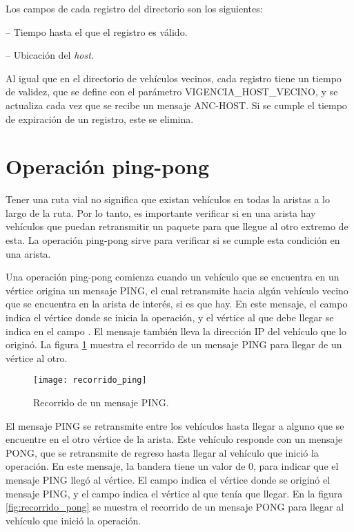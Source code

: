 Los campos de cada registro del directorio son los siguientes:

 -- Tiempo hasta el que el registro es válido.

 -- Ubicación del \textit{host}.

Al igual que en el directorio de vehículos vecinos, cada registro tiene un
tiempo de validez, que se define con el parámetro VIGENCIA\_HOST\_VECINO, y se
actualiza cada vez que se recibe un mensaje ANC-HOST. Si se cumple el tiempo de
expiración de un registro, este se elimina.

\section{Operación ping-pong}

\label{sec:operacion_ping_pong}

Tener una ruta vial no significa que existan vehículos en todas la aristas a
lo largo de la ruta. Por lo tanto, es importante verificar si en una arista hay
vehículos que puedan retransmitir un paquete para que llegue al otro extremo de
esta. La operación ping-pong sirve para verificar si se cumple esta condición
en una arista.

Una operación ping-pong comienza cuando un vehículo que se encuentra en un
vértice origina un mensaje PING, el cual retransmite hacia algún vehículo
vecino que se encuentra en la arista de interés, si es que hay. En este
mensaje, el campo  indica el vértice donde se inicia la
operación, y el vértice al que debe llegar se indica en el campo
. El mensaje también lleva la dirección IP del vehículo que
lo originó. La figura \ref{fig:recorrido_ping} muestra el recorrido de un
mensaje PING para llegar de un vértice al otro.

\begin{figure}[th!]
\centering
\texttt{[image: recorrido\_ping]}
\decoRule
\caption[Recorrido de un mensaje PING]{Recorrido de un mensaje PING.}
\label{fig:recorrido_ping}
\end{figure}

El mensaje PING se retransmite entre los vehículos hasta llegar a alguno que se
encuentre en el otro vértice de la arista. Este vehículo responde con un
mensaje PONG, que se retransmite de regreso hasta llegar al vehículo que inició
la operación. En este mensaje, la bandera  tiene un valor de 0, para
indicar que el mensaje PING llegó al vértice. El campo 
indica el vértice donde se originó el mensaje PING, y el campo  indica el vértice al que tenía que llegar. En la figura
\ref{fig:recorrido_pong} se muestra el recorrido de un mensaje PONG para llegar
al vehículo que inició la operación.

